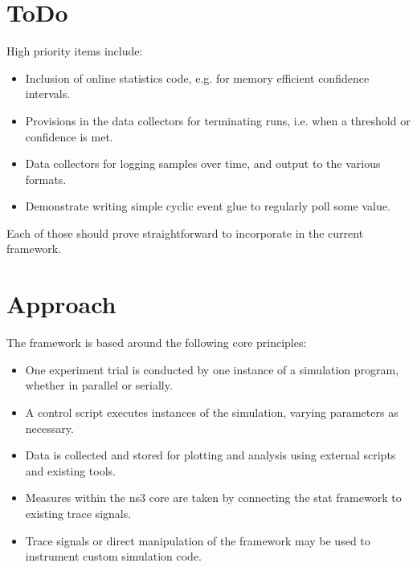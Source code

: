 \documentclass[letterpaper,10pt,english]{sphinxmanual}
\begin{document}
\section{To\sphinxhyphen{}Do}
\label{\detokenize{statistics:to-do}}
High priority items include:
\begin{itemize}
\item {} 
Inclusion of online statistics code, e.g. for memory efficient confidence intervals.

\item {} 
Provisions in the data collectors for terminating runs, i.e. when a threshold or confidence is met.

\item {} 
Data collectors for logging samples over time, and output to the various formats.

\item {} 
Demonstrate writing simple cyclic event glue to regularly poll some value.

\end{itemize}

Each of those should prove straightforward to incorporate in the current framework.


\section{Approach}
\label{\detokenize{statistics:approach}}
The framework is based around the following core principles:
\begin{itemize}
\item {} 
One experiment trial is conducted by one instance of a simulation program, whether in parallel or serially.

\item {} 
A control script executes instances of the simulation, varying parameters as necessary.

\item {} 
Data is collected and stored for plotting and analysis using external scripts and existing tools.

\item {} 
Measures within the ns\sphinxhyphen{}3 core are taken by connecting the stat framework to existing trace signals.

\item {} 
Trace signals or direct manipulation of the framework may be used to instrument custom simulation code.

\end{itemize}
\end{document}

